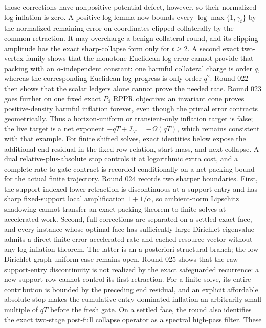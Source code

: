those corrections have nonpositive potential defect, however, so their
normalized log-inflation is zero.  A positive-log lemma now bounds every
$\log\max\{1,\gamma_t\}$ by the normalized remaining error on coordinates
clipped collaterally by the common retraction.  It may overcharge a benign
collateral round, and its clipping amplitude has the exact sharp-collapse
form only for $t\geq2$.  A second exact two-vertex
family shows that the monotone Euclidean log-error cannot provide that
packing with an $\alpha$-independent constant: one harmful collateral charge
is order $q$, whereas the corresponding Euclidean log-progress is only order
$q^2$.  Round 022 then shows that the scalar ledgers alone cannot prove the
needed rate.  Round 023 goes further on one fixed exact $P_4$ RPPR objective:
an invariant cone proves positive-density harmful inflation forever, even
though the primal error contracts geometrically.  Thus a horizon-uniform or
transient-only inflation target is false; the live target is a net exponent
$-qT+\mathcal I_T=-\Omega(qT)$, which remains consistent with that example.
For finite shifted solves, exact identities below expose the additional end
residual in the fixed-row relation, start mass, and next collapse.  A dual
relative-plus-absolute stop controls it at logarithmic extra cost, and a
complete rate-to-gate contract is recorded conditionally on a net packing
bound for the actual finite trajectory.  Round 024 records two sharper
boundaries.  First, the support-indexed lower retraction is discontinuous at
a support entry and has sharp fixed-support local amplification
$1+1/\alpha$, so ambient-norm Lipschitz shadowing cannot transfer an exact
packing theorem to finite solves at accelerated work.  Second, full
corrections are separated on a settled exact face, and every instance whose
optimal face has sufficiently large Dirichlet eigenvalue admits a direct
finite-error accelerated rate and cached resource vector without any
log-inflation theorem.  The latter is an a-posteriori structural branch; the
low-Dirichlet graph-uniform case remains open.  Round 025 shows that the raw
support-entry discontinuity is not realized by the exact safeguarded
recurrence: a new support row cannot control its first retraction.  For a
finite solve, its entire contribution is bounded by the preceding end
residual, and an explicit affordable absolute stop makes the cumulative
entry-dominated inflation an arbitrarily small multiple of $qT$ before the
fresh gate.  On a settled face, the round also identifies the exact
two-stage post-full collapse operator as a spectral high-pass filter.  These
